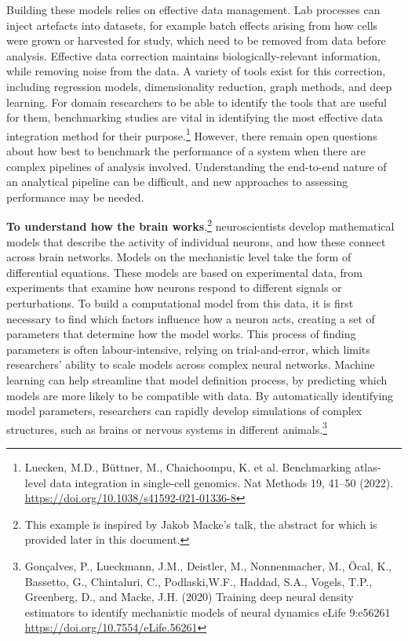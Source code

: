 Building these models relies on effective data management. Lab processes
can inject artefacts into datasets, for example batch effects arising
from how cells were grown or harvested for study, which need to be
removed from data before analysis. Effective data correction maintains
biologically-relevant information, while removing noise from the data. A
variety of tools exist for this correction, including regression models,
dimensionality reduction, graph methods, and deep learning. For domain
researchers to be able to identify the tools that are useful for them,
benchmarking studies are vital in identifying the most effective data
integration method for their purpose.\footnote{Luecken, M.D., Büttner,
  M., Chaichoompu, K. et al. Benchmarking atlas-level data integration
  in single-cell genomics. Nat Methods 19, 41--50 (2022).
  \href{https://doi.org/10.1038/s41592-021-01336-8}{\uline{https://doi.org/10.1038/s41592-021-01336-8}}}
However, there remain open questions about how best to benchmark the
performance of a system when there are complex pipelines of analysis
involved. Understanding the end-to-end nature of an analytical pipeline
can be difficult, and new approaches to assessing performance may be
needed.

\textbf{To understand how the brain works},\footnote{This example is
  inspired by Jakob Macke's talk, the abstract for which is provided
  later in this document.} neuroscientists develop mathematical models
that describe the activity of individual neurons, and how these connect
across brain networks. Models on the mechanistic level take the form of
differential equations. These models are based on experimental data,
from experiments that examine how neurons respond to different signals
or perturbations. To build a computational model from this data, it is
first necessary to find which factors influence how a neuron acts,
creating a set of parameters that determine how the model works. This
process of finding parameters is often labour-intensive, relying on
trial-and-error, which limits researchers' ability to scale models
across complex neural networks. Machine learning can help streamline
that model definition process, by predicting which models are more
likely to be compatible with data. By automatically identifying model
parameters, researchers can rapidly develop simulations of complex
structures, such as brains or nervous systems in different
animals.\footnote{Gonçalves, P., Lueckmann, J.M., Deistler, M.,
  Nonnenmacher, M., Öcal, K., Bassetto, G., Chintaluri, C.,
  Podlaski,W.F., Haddad, S.A., Vogels, T.P., Greenberg, D., and Macke,
  J.H. (2020) Training deep neural density estimators to identify
  mechanistic models of neural dynamics eLife 9:e56261
  \href{https://doi.org/10.7554/eLife.56261}{\uline{https://doi.org/10.7554/eLife.56261}}}

